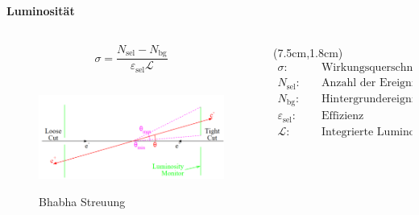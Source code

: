\begin{iframe}
	\framesubtitle{Luminosität}

		\begin{columns}
		\begin{column}{0.70\textwidth}
			\begin{equation*}
				\sigma = \frac{N_\text{sel}-N_\text{bg}}{\varepsilon_\text{sel} \mathcal{L}}
			\end{equation*}

	\begin{figure}
		\includegraphics[height=3.5cm]{img/bhabha}
		\caption*{Bhabha Streuung \cite{huz0}}
	\end{figure}

		\end{column}
		\begin{column}{0.30\textwidth}

	\begin{textblock*}{6cm}(7.5cm,1.8cm) %
			{\small
			\begin{align*}
				\sigma:& \quad \text{Wirkungsquerschnitt}\\
				N_\text{sel}:& \quad \text{Anzahl der Ereignisse}\\
				N_\text{bg}:& \quad \text{Hintergrundereignisse}\\
				\varepsilon_\text{sel}:& \quad \text{Effizienz} \\
				\mathcal{L}:& \quad \text{Integrierte Luminosität} \\
			\end{align*} }
		\end{textblock*}
		\end{column}
\end{columns}


\end{iframe}

